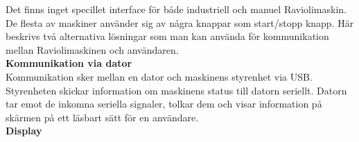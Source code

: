 Det finns inget specillet interface för både industriell och manuel Raviolimaskin. De flesta av maskiner använder sig av några knappar som start/stopp knapp. Här beskrivs två alternativa lösningar som man kan använda för kommunikation mellan Raviolimaskinen och användaren.\\

\textbf{Kommunikation via dator}\\
Kommunikation sker mellan en dator och maskinens styrenhet via USB. Styrenheten skickar information om maskinens status till datorn seriellt. Datorn tar emot de inkomna seriella signaler, tolkar dem och visar information på skärmen på ett läsbart sätt för en användare.\\


\textbf{Display}\\